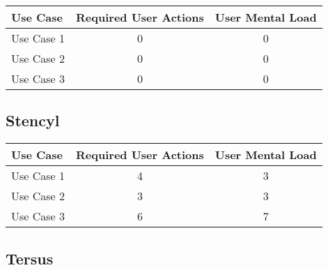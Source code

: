 \begin{tabularx}{\textwidth}{Xcc}
\textbf{Use Case} & \textbf{Required User Actions} & \textbf{User Mental Load}\\
\hline
Use Case 1                          & 0 & 0 \\
Use Case 2                          & 0 & 0 \\
Use Case 3                          & 0 & 0
\end{tabularx}

\subsection{Stencyl}




\begin{tabularx}{\textwidth}{Xcc}
\textbf{Use Case} & \textbf{Required User Actions} & \textbf{User Mental Load}\\
\hline
Use Case 1                          & 4 & 3 \\
Use Case 2                          & 3 & 3 \\
Use Case 3                          & 6 & 7
\end{tabularx}

\subsection{Tersus}

